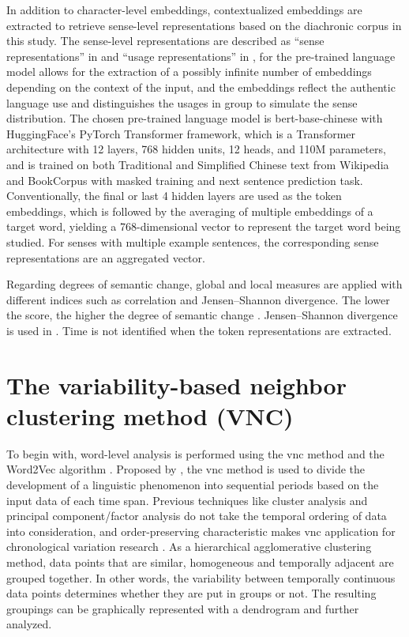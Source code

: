 In addition to character-level embeddings, contextualized embeddings are extracted to retrieve sense-level representations based on the diachronic corpus in this study. The sense-level representations are described as ``sense representations'' in \textcite{hu2019diachronic} and ``usage representations'' in \textcite{giulianelli2019lexical}, for the pre-trained language model allows for the extraction of a possibly infinite number of embeddings depending on the context of the input, and the embeddings reflect the authentic language use and distinguishes the usages in group to simulate the sense distribution. The chosen pre-trained language model is bert-base-chinese \parencite{devlin2018bert} with HuggingFace's PyTorch Transformer framework, which is a Transformer architecture with 12 layers, 768 hidden units, 12 heads, and 110M parameters, and is trained on both Traditional and Simplified Chinese text from Wikipedia and BookCorpus with masked training and next sentence prediction task. Conventionally, the final or last 4 hidden layers are used as the token embeddings, which is followed by the averaging of multiple embeddings of a target word, yielding a 768-dimensional vector to represent the target word being studied. For senses with multiple example sentences, the corresponding sense representations are an aggregated vector.

Regarding degrees of semantic change, global and local measures are applied with different indices such as correlation and Jensen–Shannon divergence. The lower the score, the higher the degree of semantic change \parencite{hamilton2016law}. Jensen–Shannon divergence is used in \textcite{giulianelli2019lexical}. Time is not identified when the token representations are extracted.

\section{The variability-based neighbor clustering method ({VNC})}
To begin with, word-level analysis is performed using the \gls{vnc} method \parencite{gries2012variability} and the Word2Vec algorithm \parencite{mikolov2013efficient}. Proposed by \textcite{gries2012variability}, the \gls{vnc} method is used to divide the development of a linguistic phenomenon into sequential periods based on the input data of each time span. Previous techniques like cluster analysis and principal component/factor analysis do not take the temporal ordering of data into consideration, and order-preserving characteristic makes \gls{vnc} application for chronological variation research \parencite{moisl2015cluster}. As a hierarchical agglomerative clustering method, data points that are similar, homogeneous and temporally adjacent are grouped together. In other words, the variability between temporally continuous data points determines whether they are put in groups or not. The resulting groupings can be graphically represented with a dendrogram and further analyzed.

